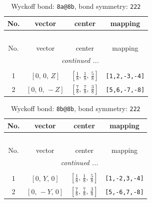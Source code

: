 \documentclass[fleqn,8pt]{jsarticle}
\begin{document}
\begin{longtable}{cccc}
\caption{Wyckoff bond: {\tt 8a@8b}, bond symmetry: {\tt 222}}
 \\
 \hline \hline
No. & vector & center & mapping \\ \hline \endfirsthead

\multicolumn{3}{l}{\tablename\ \thetable{}} \\
 \hline \hline
No. & vector & center & mapping \\ \hline \endhead

 \hline \hline
\multicolumn{3}{r}{\footnotesize\it continued ...} \\ \endfoot

 \hline \hline
\multicolumn{3}{r}{} \\ \endlastfoot

1 & $\left[ 0,\, 0,\, Z \right]$ & $\left[ \frac{1}{8},\, \frac{1}{8},\, \frac{5}{8} \right]$ & {\tt [1,2,-3,-4]} \\ \hline
2 & $\left[ 0,\, 0,\, - Z \right]$ & $\left[ \frac{7}{8},\, \frac{7}{8},\, \frac{3}{8} \right]$ & {\tt [5,6,-7,-8]} \\
\end{longtable}
\renewcommand{\arraystretch}{1.2}
\begin{longtable}{cccc}
\caption{Wyckoff bond: {\tt 8b@8b}, bond symmetry: {\tt 222}}
 \\
 \hline \hline
No. & vector & center & mapping \\ \hline \endfirsthead

\multicolumn{3}{l}{\tablename\ \thetable{}} \\
 \hline \hline
No. & vector & center & mapping \\ \hline \endhead

 \hline \hline
\multicolumn{3}{r}{\footnotesize\it continued ...} \\ \endfoot

 \hline \hline
\multicolumn{3}{r}{} \\ \endlastfoot

1 & $\left[ 0,\, Y,\, 0 \right]$ & $\left[ \frac{1}{8},\, \frac{1}{8},\, \frac{5}{8} \right]$ & {\tt [1,-2,3,-4]} \\ \hline
2 & $\left[ 0,\, - Y,\, 0 \right]$ & $\left[ \frac{7}{8},\, \frac{7}{8},\, \frac{3}{8} \right]$ & {\tt [5,-6,7,-8]} \\
\end{longtable}
\renewcommand{\arraystretch}{1.2}
\end{document}
